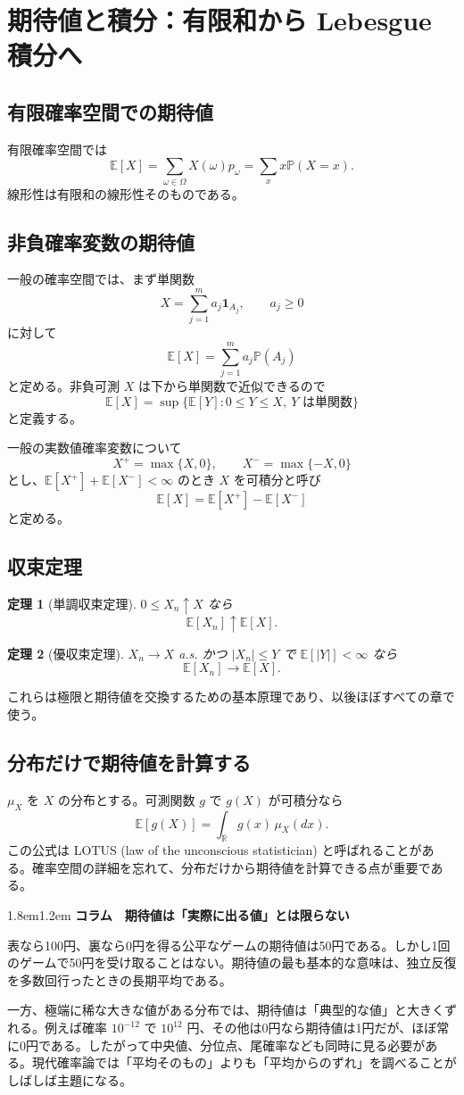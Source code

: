 \documentclass[a4paper,11pt,pdflatex,ja=standard,jafont=ipaex-type1,
  magstyle=real,scale=1]{bxjsarticle}
\newtheorem{theorem}{定理}[section]
\theoremstyle{definition}
\theoremstyle{remark}
\newenvironment{columnnote}[1]
{\par\medskip\begin{adjustwidth}{1.8em}{1.2em}\small\sffamily\color{ColumnText}
{\large\bfseries\color{Accent}コラム　#1}\par\vspace{0.25em}{\color{Accent}\hrule height 0.7pt}\vspace{0.65em}}
{\par\vspace{0.45em}{\color{Accent}\hrule height 0.3pt}\end{adjustwidth}\medskip}
\newcommand{\E}{\mathbb E}
\newcommand{\Pp}{\mathbb P}
\newcommand{\R}{\mathbb R}
\newcommand{\1}{\mathbf 1}
\begin{document}
\section{期待値と積分：有限和から Lebesgue 積分へ}
\subsection{有限確率空間での期待値}
有限確率空間では
\[
\E[X]=\sum_{\omega\in\Omega}X(\omega)p_\omega
=\sum_x x\Pp(X=x).
\]
線形性は有限和の線形性そのものである。

\subsection{非負確率変数の期待値}
一般の確率空間では、まず単関数
\[
X=\sum_{j=1}^m a_j\1_{A_j},\qquad a_j\ge0
\]
に対して
\[
\E[X]=\sum_{j=1}^m a_j\Pp(A_j)
\]
と定める。非負可測 $X$ は下から単関数で近似できるので
\[
\E[X]=\sup\{\E[Y]:0\le Y\le X,\ Y\text{ は単関数}\}
\]
と定義する。

一般の実数値確率変数について
\[
X^+=\max\{X,0\},\qquad X^-=\max\{-X,0\}
\]
とし、$\E[X^+]+\E[X^-]<\infty$ のとき $X$ を可積分と呼び
\[
\E[X]=\E[X^+]-\E[X^-]
\]
と定める。

\subsection{収束定理}
\begin{theorem}[単調収束定理]
$0\le X_n\uparrow X$ なら
\[
\E[X_n]\uparrow \E[X].
\]
\end{theorem}
\begin{theorem}[優収束定理]
$X_n\to X$ a.s. かつ $|X_n|\le Y$ で $\E[|Y|]<\infty$ なら
\[
\E[X_n]\to\E[X].
\]
\end{theorem}
これらは極限と期待値を交換するための基本原理であり、以後ほぼすべての章で使う。

\subsection{分布だけで期待値を計算する}
$\mu_X$ を $X$ の分布とする。可測関数 $g$ で $g(X)$ が可積分なら
\[
\E[g(X)]=\int_{\R}g(x)\,\mu_X(dx).
\]
この公式は LOTUS (law of the unconscious statistician) と呼ばれることがある。確率空間の詳細を忘れて、分布だけから期待値を計算できる点が重要である。

\begin{columnnote}{期待値は「実際に出る値」とは限らない}
表なら100円、裏なら0円を得る公平なゲームの期待値は50円である。しかし1回のゲームで50円を受け取ることはない。期待値の最も基本的な意味は、独立反復を多数回行ったときの長期平均である。

一方、極端に稀な大きな値がある分布では、期待値は「典型的な値」と大きくずれる。例えば確率 $10^{-12}$ で $10^{12}$ 円、その他は0円なら期待値は1円だが、ほぼ常に0円である。したがって中央値、分位点、尾確率なども同時に見る必要がある。現代確率論では「平均そのもの」よりも「平均からのずれ」を調べることがしばしば主題になる。
\end{columnnote}
\end{document}
